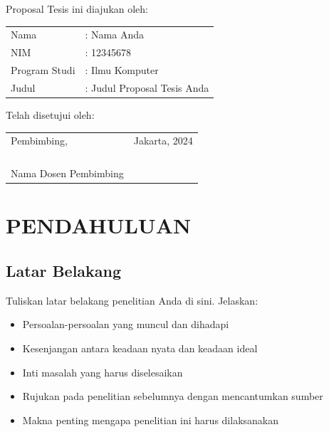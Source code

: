 \documentclass[12pt,a4paper]{article}
\begin{document}
\noindent
Proposal Tesis ini diajukan oleh:\\

\noindent
\begin{tabular}{ll}
Nama & : Nama Anda \\
NIM & : 12345678 \\
Program Studi & : Ilmu Komputer \\
Judul & : Judul Proposal Tesis Anda \\
\end{tabular}

\vspace{2cm}

\noindent
Telah disetujui oleh:

\vspace{3cm}

\noindent
\begin{tabular}{p{7cm}p{7cm}}
Pembimbing, & Jakarta, \underline{\hspace{3cm}} 2024\\
& \\
& \\
& \\
\underline{\hspace{6cm}} & \\
Nama Dosen Pembimbing & \\
\end{tabular}

\newpage
\setcounter{page}{1}

\section{PENDAHULUAN}

\subsection{Latar Belakang}
Tuliskan latar belakang penelitian Anda di sini. Jelaskan:
\begin{itemize}
    \item Persoalan-persoalan yang muncul dan dihadapi
    \item Kesenjangan antara keadaan nyata dan keadaan ideal
    \item Inti masalah yang harus diselesaikan
    \item Rujukan pada penelitian sebelumnya dengan mencantumkan sumber
    \item Makna penting mengapa penelitian ini harus dilaksanakan
\end{itemize}
\end{document}
